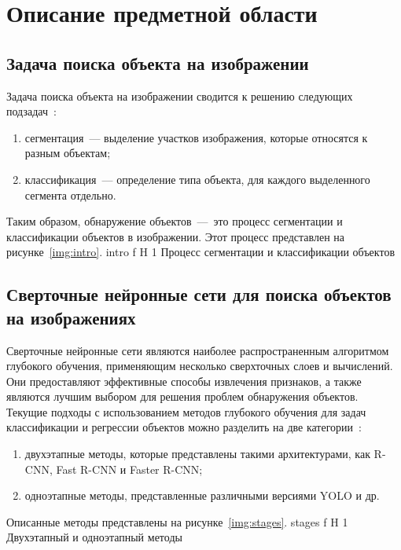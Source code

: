 \chapter{Описание предметной области}

\section{Задача поиска объекта на изображении}

Задача поиска объекта на изображении сводится к решению следующих подзадач~\cite{task}: 
\begin{enumerate}[leftmargin=1.6\parindent]
	\item сегментация~--- выделение участков изображения, которые относятся к разным объектам;
	\item классификация~--- определение типа объекта, для каждого выделенного сегмента отдельно.
\end{enumerate}
Таким образом, обнаружение объектов~---~это процесс сегментации и классификации объектов в изображении.
Этот процесс представлен на рисунке~\ref{img:intro}.
	{intro}
	{f}
	{H}
	{1\textwidth}
	{Процесс сегментации и классификации объектов}

\section{Сверточные нейронные сети для поиска объектов на изображениях}

Сверточные нейронные сети являются наиболее распространенным алгоритмом глубокого обучения, применяющим несколько сверхточных слоев и вычислений.
Они предоставляют эффективные способы извлечения признаков, а также являются лучшим выбором для решения проблем обнаружения объектов.
Текущие подходы с использованием методов глубокого обучения для задач классификации и регрессии объектов можно разделить на две категории~\cite{base}:
\begin{enumerate}[leftmargin=1.6\parindent]
	\item двухэтапные методы, которые представлены такими архитектурами, как R-CNN, Fast R-CNN и Faster R-CNN;
	\item одноэтапные методы, представленные различными версиями YOLO и др.
\end{enumerate}

Описанные методы представлены на рисунке~\ref{img:stages}.
	{stages}
	{f}
	{H}
	{1\textwidth}
	{Двухэтапный и одноэтапный методы}

